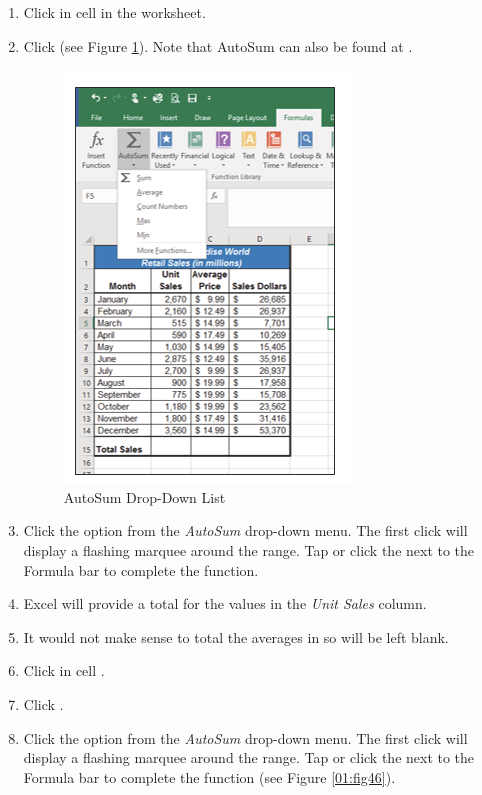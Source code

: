 \begin{enumbox}
	\begin{enumerate}
		\item Click in cell  in the  worksheet.
		\item Click  (see Figure \ref{01:fig45}). Note that AutoSum can also be found at .
	
		\begin{figure}[H]
			\centering
			\includegraphics[width=\maxwidth{.95\linewidth}]{gfx/ch01_fig45}
			\caption{AutoSum Drop-Down List}
			\label{01:fig45}
		\end{figure}

		\item Click the  option from the \textit{AutoSum} drop-down menu. The first click will display a flashing marquee around the range. Tap  or click the  next to the Formula bar to complete the function.
		\item Excel will provide a total for the values in the \textit{Unit Sales} column.
		\item It would not make sense to total the averages in  so  will be left blank.
		\item Click in cell . 
		\item Click . 
		\item Click the  option from the \textit{AutoSum} drop-down menu. The first click will display a flashing marquee around the range. Tap  or click the  next to the Formula bar to complete the function (see Figure \ref{01:fig46}).
	\end{enumerate}
\end{enumbox}

